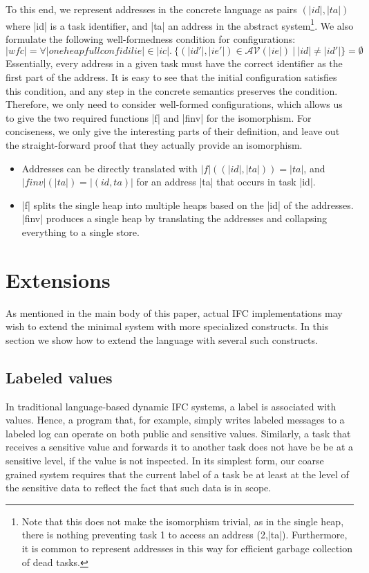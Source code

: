 To this end, we represent addresses in the concrete language as
pairs $(|id|,|ta|)$ where |id| is a task identifier, and |ta| an
address in the abstract system\footnote{Note that this does
  not make the isomorphism trivial, as in the single heap, there
  is nothing preventing task 1 to access an address (2,|ta|).
  Furthermore, it is common to represent addresses in this way
  for efficient garbage collection of dead tasks.}.
We also formulate the following well-formedness condition for
configurations:
\[
  |wf c| = \forall |oneheapfullconf id il ie| \in |ic|.\ 
  \{ (|id'|,|ie'|) \in \mathcal{AV}(|ie|) \ \vert\ |id| \neq |id'| \} = \emptyset
\]
Essentially, every address in a given task must have the correct
identifier as the first part of the address.  It is easy to
see that the initial configuration satisfies this condition, and
any step in the concrete semantics preserves the condition.
Therefore, we only need to consider well-formed configurations,
which allows us to give the two required functions
|f| and |finv| for the isomorphism.  For conciseness, we only give
the interesting parts of their definition,
and leave out the straight-forward proof that they
actually provide an isomorphism.
\begin{itemize}
  \item Addresses can be directly translated with
  $|f|((|id|,|ta|))=|ta|$, and $|finv|(|ta|)=|(id,ta)|$ for
  an address |ta| that occurs in task |id|.
  \item |f| splits the single heap into multiple heaps based on
  the |id| of the addresses.  |finv| produces a single heap
  by translating the addresses and collapsing everything to a single
  store.
\end{itemize}




\section{Extensions}
\label{sec:appendix-extensions}

As mentioned in the main body of this paper,
actual IFC implementations
may wish to extend the minimal system with more specialized
constructs.
In this section we show how to extend the language with several such
constructs.
%

\subsection{Labeled values}
In traditional language-based dynamic IFC systems, a label is
associated with values.
%
Hence, a program that, for example, simply writes labeled messages to
a labeled log can operate on both public and sensitive values.
Similarly, a task that receives a sensitive value and forwards it
to another task does not have be be at a sensitive level, if the
value is not inspected.
%
In its simplest form, our coarse grained system requires that the
current label of a task be at least at the level of the sensitive data
to reflect the fact that such data is in scope.

